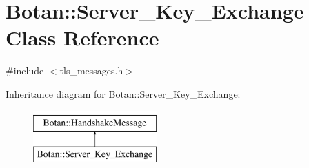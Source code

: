 \hypertarget{classBotan_1_1Server__Key__Exchange}{\section{Botan\-:\-:Server\-\_\-\-Key\-\_\-\-Exchange Class Reference}
\label{classBotan_1_1Server__Key__Exchange}
}


{\ttfamily \#include $<$tls\-\_\-messages.\-h$>$}

Inheritance diagram for Botan\-:\-:Server\-\_\-\-Key\-\_\-\-Exchange\-:\begin{figure}[H]
\begin{center}
\leavevmode
\includegraphics[height=2.000000cm]{classBotan_1_1Server__Key__Exchange}
\end{center}
\end{figure}

